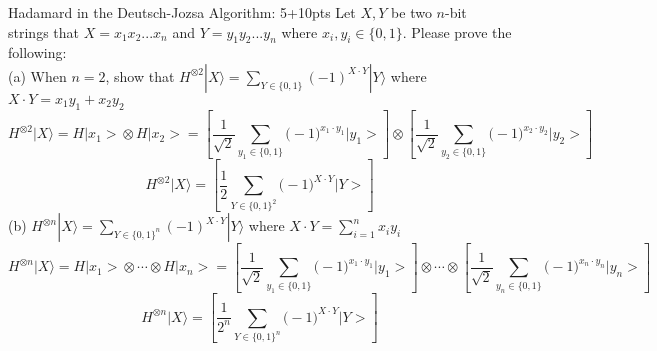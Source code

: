 \documentclass[12pt]{article}
\makeatletter
\newcommand{\<}{\langle}
\renewcommand{\>}{\rangle}
\newcommand{\kets}[1]{| #1 \rangle}                 %
\newenvironment{problem}{\@startsection
       {section}
       {1}
       {-.2em}
       {-3.5ex plus -1ex minus -.2ex}
       {2.3ex plus .2ex}
       {\pagebreak[3]
       \large\bf\noindent{Problem }
       }
       }
       {%
       \begin{center}\large\bf \end{center}}
\def\ket#1{\big|{#1}\big>}
\makeatother
\begin{document}
\begin{problem}{Hadamard in the Deutsch-Jozsa Algorithm: 5+10pts}
Let $X, Y$ be two $n$-bit strings that $X = x_1x_2...x_n$ and $Y =y_1y_2...y_n$ where $x_i , y_i \in \{0,1\}$.  Please prove the following:\\
(a) When $n=2$, show that $H^{\otimes 2}\kets{X} = \sum_{Y \in \{0,1\}}(-1)^{X \cdot Y}\kets{Y}$ where $X\cdot Y = x_1y_1 + x_2y_2$ \\
$$H^{\otimes 2}\kets{X} = H\ket{x_1} \otimes H\ket{x_2} = \left[\frac{1}{\sqrt{2}}\sum\limits_{y_1\in\{0,1\}}\big(-1\big)^{x_1\cdot y_1}\ket{y_1}\right] 
											  \otimes \left[\frac{1}{\sqrt{2}}\sum\limits_{y_2\in\{0,1\}}\big(-1\big)^{x_2\cdot y_2}\ket{y_2}\right]$$
$$H^{\otimes 2}\kets{X} = \left[\frac{1}{2}\sum\limits_{Y\in\{0,1\}^2}\big(-1\big)^{X\cdot Y}\ket{Y}\right]$$
\noindent											  											  
(b) $H^{\otimes n}\kets{X} =  \sum_{Y \in \{0,1\}^n} (-1)^{X \cdot Y}\kets{Y}$ where $X \cdot Y = \sum_{i=1}^{n} x_iy_i$\\
$$H^{\otimes n}\kets{X} = H\ket{x_1} \otimes \cdots \otimes H\ket{x_n} = \left[\frac{1}{\sqrt{2}}\sum\limits_{y_1\in\{0,1\}}\big(-1\big)^{x_1\cdot y_1}\ket{y_1}\right] 
											  \otimes \cdots \otimes \left[\frac{1}{\sqrt{2}}\sum\limits_{y_n\in\{0,1\}}\big(-1\big)^{x_n\cdot y_n}\ket{y_n}\right]$$
$$H^{\otimes n}\kets{X} = \left[\frac{1}{2^n}\sum\limits_{Y\in\{0,1\}^n}\big(-1\big)^{X\cdot Y}\ket{Y}\right]$$
\noindent											  
\end{problem}
\newpage
\end{document}

